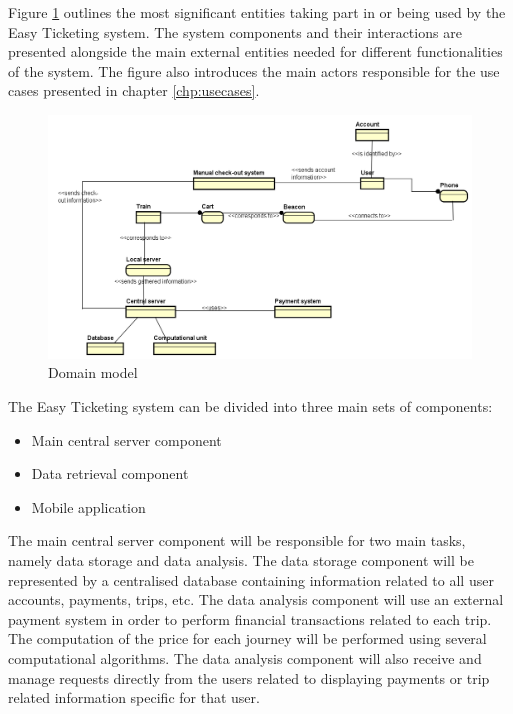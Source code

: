 
Figure \ref{fig:domain_model} outlines the most significant entities taking part in or being used by the Easy Ticketing system. The system components and their interactions are presented alongside the main external entities needed for different functionalities of the system. The figure also introduces the main actors responsible for the use cases presented in chapter \ref{chp:usecases}.

\begin{figure}[H]
	\centering
	\includegraphics[width=\textwidth]{Pictures/domain_model.png}
	\caption{Domain model}
	\label{fig:domain_model}
\end{figure}

The Easy Ticketing system can be divided into three main sets of components:
\begin{itemize}
	\item Main central server component
	\item Data retrieval component
	\item Mobile application
\end{itemize}

The main central server component will be responsible for two main tasks, namely data storage and data analysis. The data storage component will be represented by a centralised database containing information related to all user accounts, payments, trips, etc. The data analysis component will use an external payment system in order to perform financial transactions related to each trip. The computation of the price for each journey will be performed using several computational algorithms. The data analysis component will also receive and manage requests directly from the users related to displaying payments or trip related information specific for that user.


